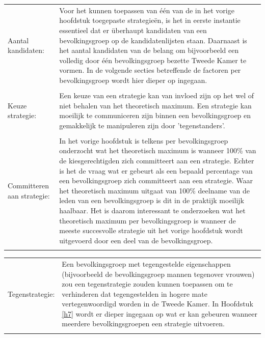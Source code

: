 \noindent\begin{tabularx}{\textwidth}{LI}
Aantal kandidaten: &  Voor het kunnen toepassen van één van de in het vorige hoofdstuk toegepaste strategie\"{e}n, is het in eerste instantie essentieel dat er \"{u}berhaupt kandidaten van een bevolkingsgroep op de kandidatenlijsten staan. Daarnaast is het aantal kandidaten van de belang om bijvoorbeeld een volledig door één bevolkingsgroep bezette Tweede Kamer te vormen. In de volgende secties betreffende de factoren per bevolkingsgroep wordt hier dieper op ingegaan. \\
\\ 
Keuze strategie: &  Een keuze van een strategie kan van invloed zijn op het wel of niet behalen van het theoretisch maximum. Een strategie kan moeilijk te communiceren zijn binnen een bevolkingsgroep en gemakkelijk te manipuleren zijn door 'tegenstanders'.\\
\\ 
Committeren aan strategie:  & In het vorige hoofdstuk is telkens per bevolkingsgroep onderzocht wat het theoretisch maximum is wanneer 100\% van de kiesgerechtigden zich committeert aan een strategie. Echter is het de vraag wat er gebeurt als een bepaald percentage van een bevolkingsgroep zich committeert aan een strategie. Waar het theoretisch maximum uitgaat van 100\% deelname van de leden van een bevolkingsgroep is dit in de praktijk moeilijk haalbaar. Het is daarom interessant te onderzoeken wat het theoretisch maximum per bevolkingsgroep is wanneer de meeste succesvolle strategie uit het vorige hoofdstuk wordt uitgevoerd door een deel van de bevolkingsgroep.  \\
\\
\end{tabularx}  
 
\noindent\begin{tabularx}{\textwidth}{LI}

Tegenstrategie: & Een bevolkingsgroep met tegengestelde eigenschappen (bijvoorbeeld de bevolkingsgroep mannen tegenover vrouwen) zou een tegenstrategie zouden kunnen toepassen om te verhinderen dat tegengestelden in hogere mate vertegenwoordigd worden in de Tweede Kamer. In Hoofdstuk \ref{h7} wordt er dieper ingegaan op wat er kan gebeuren wanneer meerdere bevolkingsgroepen een strategie uitvoeren.\\
\\
 \end{tabularx}  


